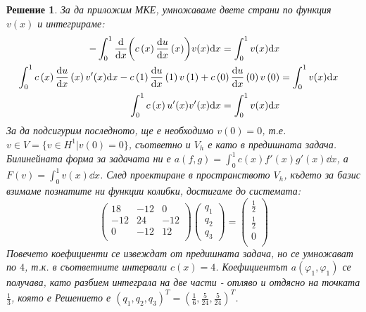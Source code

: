 \documentclass[12pt]{article}
\newtheorem*{solution*}{Решение}
\begin{document}
\begin{large}
\begin{solution*}
За да приложим МКЕ, умножаваме двете страни по функция $v(x)$ и интегрираме:
\begin{align*}
-\int_{0}^{1}\dv{x}(c\left(x\right)\dv{u}{x}\left(x\right))v(x)\dd x = \int_{0}^{1}v(x)\dd x \\
\int_{0}^{1}c\left(x\right)\dv{u}{x}\left(x\right)v'(x)\dd x - c\left(1\right)\dv{u}{x}\left(1\right)v\left(1\right) + c\left(0\right)\dv{u}{x}\left(0\right)v\left(0\right) &= \int_{0}^{1}v(x)\dd x \\
\int_{0}^{1}c\left(x\right)u'(x)v'(x)\dd x = \int_{0}^{1}v(x)\dd x \\
\end{align*}
За да подсигурим последното, ще е необходимо $v\left(0\right)=0$, т.е. $v \in V = \{v \in H^1 \vert v\left(0\right)=0\}$, съответно и $V_h$ е като в предишната задача. Билинейната форма за задачата ни е $a\left(f, g\right)=\int_{0}^{1}c(x)f'(x)g'(x)\dd x$, а $F\left(v\right)=\int_{0}^{1}v(x)\dd x$. След проектиране в пространството $V_h$, където за базис взимаме познатите ни функции колибки,  достигаме до системата: 
\begin{equation}
	\begin{pmatrix}
	18 & -12 & 0 \\
	-12 & 24 & -12 \\
	0 & -12 & 12 \\
	\end{pmatrix}
	\begin{pmatrix}
      q_1 \\
      q_2 \\
      q_3
    \end{pmatrix}
    =
    \begin{pmatrix}
      \frac{1}{2} \\
      \frac{1}{2} \\
      0 \\
    \end{pmatrix}
\end{equation}
Повечето коефициенти се извеждат от предишната задача, но се умножават по $4$, т.к. в съответните интервали $c(x)=4$. Коефициентът $a\left(\varphi_1, \varphi_1\right)$ се получава, като разбием интеграла на две части - отляво и отдясно на точката $\frac{1}{3}$, която е 
Решението е $(q_1, q_2, q_3)^T = (\frac{1}{6}, \frac{5}{24}, \frac{5}{24})^T$.
\end{solution*}
\end{large}
\end{document}
